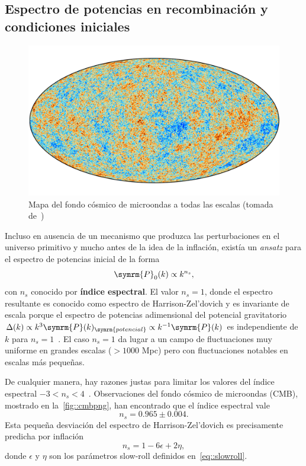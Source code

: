 \subsection{Espectro de potencias en recombinación y condiciones iniciales}\label{sec::espectrolin}
\begin{figure}[t]
    \centering
    \includegraphics[scale=.7]{img/Cmb_inpaint_T_smica_v1-min.png}
    \caption[Mapa del fondo cósmico de microondas]{Mapa del fondo cósmico de microondas a todas las escalas (tomada de~\cite{collaboration2020planck4})}
    \label{fig::cmbpng}
\end{figure}
Incluso en ausencia de un mecanismo que produzca las perturbaciones en el universo primitivo y mucho antes de la idea de la inflación, existía un \textit{ansatz} para el espectro de potencias inicial de la forma~\cite{harrison1970,zel1970hypothesis,peebles1970primeval}
\begin{equation}
    \symrm{P}_0(k)\propto k^{n_s},\label{eq::espectroprim}
\end{equation}
con \(n_s\) conocido por \textbf{índice espectral}. El valor \(n_s=1\), donde el espectro resultante es conocido como espectro de Harrison-Zel'dovich y es invariante de escala porque el espectro de potencias adimensional del potencial gravitatorio \(\Delta(k)\propto k^3\symrm{P}(k)_{\symrm{potencial}}\propto k^{-1}\symrm{P}(k)\) es independiente de \(k\) para \(n_s=1\)~\cite{baumann2022cosmology}. El caso \(n_s=1\) da lugar a un campo de fluctuaciones muy uniforme en grandes escalas (\(>1000\) Mpc) pero con fluctuaciones notables en escalas más pequeñas.

De cualquier manera, hay razones justas para limitar los valores del índice espectral \(-3<n_s<4\)~\cite{peacock1998cosmological}. Observaciones del fondo cósmico de microondas (CMB), mostrado en la~\autoref{fig::cmbpng}, han encontrado que el índice espectral vale~\cite{collaboration2020planck}
\begin{equation}
    n_s=0.965\pm 0.004.\label{eq::theoryns}
\end{equation}
Esta pequeña desviación del espectro de Harrison-Zel'dovich es precisamente predicha por inflación
\begin{equation}
    n_s=1-6\epsilon+2\eta,
\end{equation}
donde \(\epsilon\) y \(\eta\) son los parámetros slow-roll definidos en~\eqref{eq::slowroll}.

